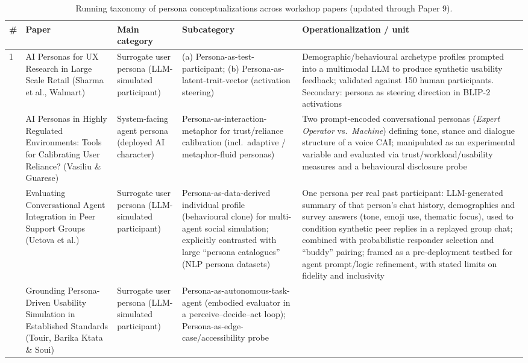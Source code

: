 \begin{table}[t]
\centering
\caption{Running taxonomy of persona conceptualizations across workshop papers (updated through Paper 9).}
\label{tab:persona-taxonomy}
\small
\begin{tabular}{p{0.5cm} p{3.6cm} p{3.4cm} p{3.6cm} p{3.6cm}}
\toprule
\textbf{\#} & \textbf{Paper} & \textbf{Main category} & \textbf{Subcategory} & \textbf{Operationalization / unit} \\
\midrule
1 & AI Personas for UX Research in Large Scale Retail (Sharma et al., Walmart) &
Surrogate user persona (LLM-simulated participant) &
(a) Persona-as-test-participant; (b) Persona-as-latent-trait-vector (activation steering) &
Demographic/behavioural archetype profiles prompted into a multimodal LLM to produce synthetic usability feedback; validated against 150 human participants. Secondary: persona as steering direction in BLIP-2 activations \\
\addlinespace
2 & AI Personas in Highly Regulated Environments: Tools for Calibrating User Reliance? (Vasiliu \& Guarese) &
System-facing agent persona (deployed AI character) &
Persona-as-interaction-metaphor for trust/reliance calibration (incl.\ adaptive / metaphor-fluid personas) &
Two prompt-encoded conversational personas (\textit{Expert Operator} vs.\ \textit{Machine}) defining tone, stance and dialogue structure of a voice CAI; manipulated as an experimental variable and evaluated via trust/workload/usability measures and a behavioural disclosure probe \\
\addlinespace
3 & Evaluating Conversational Agent Integration in Peer Support Groups (Uetova et al.) &
Surrogate user persona (LLM-simulated participant) &
Persona-as-data-derived individual profile (behavioural clone) for multi-agent social simulation; explicitly contrasted with large ``persona catalogues'' (NLP persona datasets) &
One persona per real past participant: LLM-generated summary of that person's chat history, demographics and survey answers (tone, emoji use, thematic focus), used to condition synthetic peer replies in a replayed group chat; combined with probabilistic responder selection and ``buddy'' pairing; framed as a pre-deployment testbed for agent prompt/logic refinement, with stated limits on fidelity and inclusivity \\
\addlinespace
4 & Grounding Persona-Driven Usability Simulation in Established Standards (Touir, Barika Ktata \& Soui) &
Surrogate user persona (LLM-simulated participant) &
Persona-as-autonomous-task-agent (embodied evaluator in a perceive--decide--act loop); Persona-as-edge-case/accessibility probe &

\end{tabular}
\end{table}
